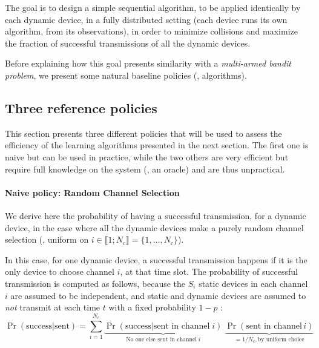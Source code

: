 The goal is to design a simple sequential algorithm, to be applied identically by each dynamic device, in a fully distributed setting (each device runs its own algorithm, from its observations), in order to minimize collisions and maximize the fraction of successful transmissions of all the dynamic devices.

Before explaining how this goal presents similarity with a \emph{multi-armed bandit problem}, we present some natural baseline policies (\ie, algorithms).


\subsection{Three reference policies}\label{sub:41:threeReferencePolicies}

This section presents three different policies that will be used to assess the efficiency of the learning algorithms presented in the next section.
The first one is naive but can be used in practice, while the two others are very efficient but require full knowledge on the system (\ie, an oracle) and are thus unpractical.


\paragraph{Naive policy: Random Channel Selection}

We derive here the probability of having a successful transmission, for a dynamic device, in the case where all the dynamic devices make a purely random channel selection (\ie, uniform on $i \in \llbracket 1; N_c \rrbracket = \{1, \dots, N_c\}$).

In this case, for one dynamic device, a successful transmission happens if it is the only device to choose channel $i$, at that time slot.
The probability of successful transmission is computed as follows, because the $S_i$ static devices in each channel $i$ are assumed to be independent, and static and dynamic devices are assumed to \emph{not} transmit at each time $t$ with a fixed probability $1-p$ :
\begin{equation}
    \Pr(\text{success}|\text{sent}) = \sum_{i=1}^{N_c} \underbrace{\Pr(\text{success}|\text{sent in channel}\;i)}_{\text{No one else sent in channel}\; i} \; \underbrace{\Pr(\text{sent in channel}\,i)}_{= 1/N_c, \text{by uniform choice}}
\end{equation}

